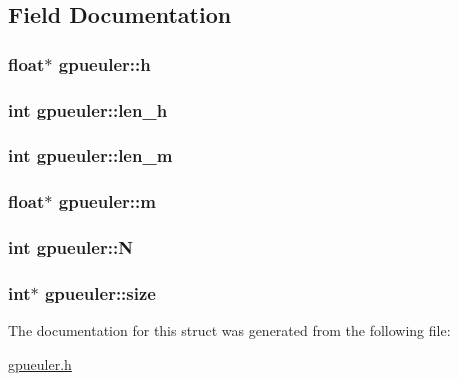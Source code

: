 \subsection{Field Documentation}
\hypertarget{structgpueuler_a498c5070bf962e7189b40e06fb7cab17}{
\subsubsection[{h}]{\setlength{\rightskip}{0pt plus 5cm}float$\ast$ {\bf gpueuler::h}}}
\label{structgpueuler_a498c5070bf962e7189b40e06fb7cab17}
\hypertarget{structgpueuler_a404bb123874d77a317934d415b8b2edf}{
\subsubsection[{len\_\-h}]{\setlength{\rightskip}{0pt plus 5cm}int {\bf gpueuler::len\_\-h}}}
\label{structgpueuler_a404bb123874d77a317934d415b8b2edf}
\hypertarget{structgpueuler_a038ca1c07835604fb3de105fcae2ab46}{
\subsubsection[{len\_\-m}]{\setlength{\rightskip}{0pt plus 5cm}int {\bf gpueuler::len\_\-m}}}
\label{structgpueuler_a038ca1c07835604fb3de105fcae2ab46}
\hypertarget{structgpueuler_ae1c9d0beceddacb821fb9f03e392eb7a}{
\subsubsection[{m}]{\setlength{\rightskip}{0pt plus 5cm}float$\ast$ {\bf gpueuler::m}}}
\label{structgpueuler_ae1c9d0beceddacb821fb9f03e392eb7a}
\hypertarget{structgpueuler_a939192bbd3a158f77f9c3fbb4527a0b4}{
\subsubsection[{N}]{\setlength{\rightskip}{0pt plus 5cm}int {\bf gpueuler::N}}}
\label{structgpueuler_a939192bbd3a158f77f9c3fbb4527a0b4}
\hypertarget{structgpueuler_a4afe1b2933e72e4c43e42b8e03c8a364}{
\subsubsection[{size}]{\setlength{\rightskip}{0pt plus 5cm}int$\ast$ {\bf gpueuler::size}}}
\label{structgpueuler_a4afe1b2933e72e4c43e42b8e03c8a364}


The documentation for this struct was generated from the following file:\begin{DoxyCompactItemize}
\item 
\hyperlink{gpueuler_8h}{gpueuler.h}\end{DoxyCompactItemize}
